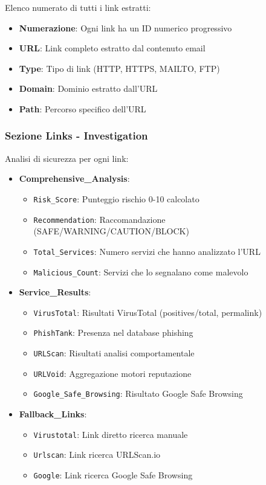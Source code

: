 \documentclass{article}
\begin{document}
Elenco numerato di tutti i link estratti:

\begin{itemize}
    \item \textbf{Numerazione}: Ogni link ha un ID numerico progressivo
    \item \textbf{URL}: Link completo estratto dal contenuto email
    \item \textbf{Type}: Tipo di link (HTTP, HTTPS, MAILTO, FTP)
    \item \textbf{Domain}: Dominio estratto dall'URL
    \item \textbf{Path}: Percorso specifico dell'URL
\end{itemize}

\subsubsection{Sezione Links - Investigation}

Analisi di sicurezza per ogni link:

\begin{itemize}
    \item \textbf{Comprehensive\_Analysis}:
    \begin{itemize}
        \item \texttt{Risk\_Score}: Punteggio rischio 0-10 calcolato
        \item \texttt{Recommendation}: Raccomandazione (SAFE/WARNING/CAUTION/BLOCK)
        \item \texttt{Total\_Services}: Numero servizi che hanno analizzato l'URL
        \item \texttt{Malicious\_Count}: Servizi che lo segnalano come malevolo
    \end{itemize}
    \item \textbf{Service\_Results}:
    \begin{itemize}
        \item \texttt{VirusTotal}: Risultati VirusTotal (positives/total, permalink)
        \item \texttt{PhishTank}: Presenza nel database phishing
        \item \texttt{URLScan}: Risultati analisi comportamentale
        \item \texttt{URLVoid}: Aggregazione motori reputazione
        \item \texttt{Google\_Safe\_Browsing}: Risultato Google Safe Browsing
    \end{itemize}
    \item \textbf{Fallback\_Links}:
    \begin{itemize}
        \item \texttt{Virustotal}: Link diretto ricerca manuale
        \item \texttt{Urlscan}: Link ricerca URLScan.io
        \item \texttt{Google}: Link ricerca Google Safe Browsing
    \end{itemize}
\end{itemize}
\end{document}
